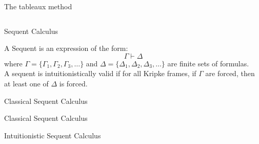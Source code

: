 \documentclass{beamer}
\begin{document}
\begin{frame}{The  tableaux method}
\begin{columns}
    
    \hfill
\end{columns}
\end{frame}












\begin{frame}{Sequent Calculus}

    \begin{block}{}
        A Sequent is an expression of the form:
        \[
        \Gamma \vdash \Delta
        \]
        where \(\Gamma = \{\Gamma_1, \Gamma_2, \Gamma_3, \dots\}\) and \(\Delta = \{\Delta_1, \Delta_2, \Delta_3, \dots\}\) are finite sets of formulas. \\
        A sequent is intuitionistically valid if for all Kripke frames, if \(\Gamma\) are forced, then at least one of \(\Delta\) is forced.
    
    \end{block}
\end{frame}




\begin{frame}{Classical Sequent Calculus}
    \tiny{
    \RulesClassicalSequentCalculusSmall
    }
\end{frame}


\begin{frame}{Classical Sequent Calculus}
    \RulesClassicalSequentCalculusSmallBF
\end{frame}



\begin{frame}{Intuitionistic Sequent Calculus}
    \tiny{
    \RulesIntuitionisticSequentCalculusSmall
    }
\end{frame}
\end{document}
